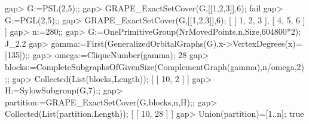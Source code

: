 \beginexample
gap> G:=PSL(2,5);;
gap> GRAPE_ExactSetCover(G,[[1,2,3]],6);
fail
gap> G:=PGL(2,5);;
gap> GRAPE_ExactSetCover(G,[[1,2,3]],6);
[ [ 1, 2, 3 ], [ 4, 5, 6 ] ]
gap> n:=280;;
gap> G:=OnePrimitiveGroup(NrMovedPoints,n,Size,604800*2);
J_2.2
gap> gamma:=First(GeneralizedOrbitalGraphs(G),x->VertexDegrees(x)=[135]);;
gap> omega:=CliqueNumber(gamma);
28
gap> blocks:=CompleteSubgraphsOfGivenSize(ComplementGraph(gamma),n/omega,2);;
gap> Collected(List(blocks,Length));
[ [ 10, 2 ] ]
gap> H:=SylowSubgroup(G,7);;
gap> partition:=GRAPE_ExactSetCover(G,blocks,n,H);;
gap> Collected(List(partition,Length));
[ [ 10, 28 ] ]
gap> Union(partition)=[1..n];
true
\endexample

